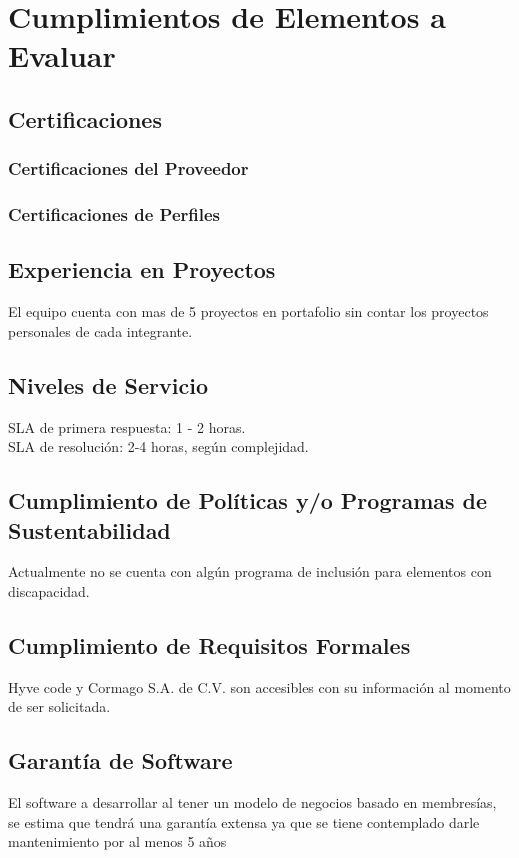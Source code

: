\documentclass{report}
\begin{document}
	
	
	\chapter{Cumplimientos de Elementos a Evaluar}
		\section{Certificaciones}
			\subsection{Certificaciones del Proveedor}
			
			\subsection{Certificaciones de Perfiles}
			
		\section{Experiencia en Proyectos}
			El equipo cuenta con mas de 5 proyectos en portafolio sin contar los proyectos personales de cada integrante.
			
		\section{Niveles de Servicio}
			SLA de primera respuesta: 1 - 2 horas.\\
			SLA de resolución: 2-4 horas, según complejidad.
			
		\section{Cumplimiento de Políticas y/o Programas de Sustentabilidad}
			Actualmente no se cuenta con algún programa de inclusión para elementos con discapacidad.
		\section{Cumplimiento de Requisitos Formales}		
			Hyve code y Cormago S.A. de C.V. son accesibles con su información al momento de ser solicitada.
		\section{Garantía de Software}
			El software a desarrollar al tener un modelo de negocios basado en membresías, se estima que tendrá una garantía extensa ya que se tiene contemplado darle mantenimiento por al menos 5 años
\end{document}
